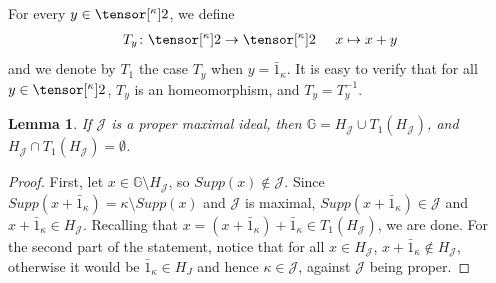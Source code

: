 \documentclass{amsart}
\numberwithin{equation}{section}
\newcommand{\pre}[2]{\tensor[^{#1}]{#2}{}}
\newcommand{\1}{\mathbf{I}}
\newcommand{\2}{\mathbf{II}}
\renewcommand{\k}{\kappa}
\newtheorem{lemma}[theorem]{Lemma}
\theoremstyle{definition}
\theoremstyle{remark}
\begin{document}
For every $y\in \pre{\k}{2}$, we define \begin{align}
    T_y \colon \pre{\k}{2} \to \pre{\k}{2} \;\;\;\;\; x \mapsto x+y
\end{align} 
and we denote by $T_1$ the case $T_y$ when $y=\bar 1_\kappa$. It is easy to verify that for all $y\in \pre{\k}{2}$, $T_y$ is an homeomorphism, and $T_y=T_y^{-1}$.


\begin{lemma}\label{division_H}
    If $\mathcal{J}$ is a proper maximal ideal, then $\mathbb G=H_\mathcal{J}\cup T_1(H_\mathcal{J})$, and $H_\mathcal{J}\cap T_1(H_\mathcal{J})=\emptyset$.
\end{lemma}
\begin{proof}
    First, let $x \in \mathbb G \setminus H_\mathcal{J}$, so $Supp(x)\notin \mathcal J$. Since $Supp(x + \bar 1_\kappa)=\kappa\setminus Supp(x)$ and $\mathcal{J}$ is maximal, $Supp( x + \bar1_\kappa )\in \mathcal{J}$ and $x + \bar1_\kappa \in H_\mathcal{J}$. Recalling that $x = (x + \bar 1_\kappa) +\bar1_\kappa \in T_1(H_\mathcal{J})$, we are done. 
    For the second part of the statement, notice that for all $x \in H_\mathcal{J}$, $x + \bar 1_\kappa  \notin  H_\mathcal{J}$, otherwise it would be $\bar1_\kappa\in H_J$ and hence $\kappa\in \mathcal{J}$, against $\mathcal{J}$ being proper.
\end{proof}
\end{document}
